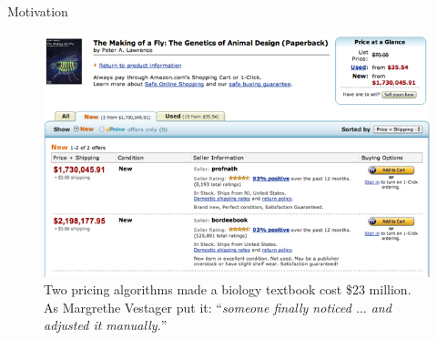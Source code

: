 \documentclass[10pt, aspectratio=169]{beamer}
\begin{document}
\begin{frame}{Motivation}
\begin{figure}
        \centering
        \includegraphics[width=0.65\linewidth]{latex/slides_pricing_collusion/imgs/the_making_of_a_fly.png}
        \caption{Two pricing algorithms made a biology textbook cost \$23 million. As Margrethe Vestager \parencite*{vestager_algorithms_2017} put it: \enquote{\emph{someone finally noticed $\ldots$ and adjusted it manually.}}}
        \label{fig:rep_org}
    \end{figure}  
\end{frame}
\end{document}
